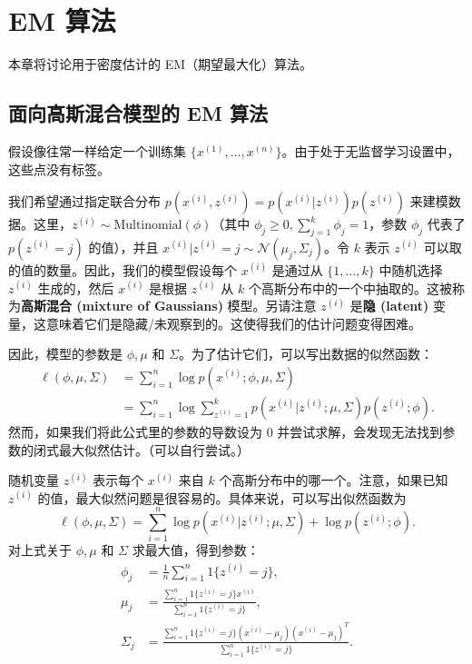\chapter{EM 算法}\label{chapter:11}

本章将讨论用于密度估计的 EM（期望最大化）算法。

\section{面向高斯混合模型的 EM 算法}

假设像往常一样给定一个训练集 $\{x^{(1)}, \dots, x^{(n)}\}$。由于处于无监督学习设置中，这些点没有标签。

我们希望通过指定联合分布 $p(x^{(i)}, z^{(i)}) = p(x^{(i)}|z^{(i)})p(z^{(i)})$ 来建模数据。这里，$z^{(i)} \sim \text{Multinomial}(\phi)$（其中 $\phi_j \geq 0, \sum_{j=1}^k \phi_j = 1$，参数 $\phi_j$ 代表了 $p(z^{(i)} = j)$ 的值），并且 $x^{(i)}|z^{(i)} = j \sim \mathcal{N}(\mu_j, \Sigma_j)$。令 $k$ 表示 $z^{(i)}$ 可以取的值的数量。因此，我们的模型假设每个 $x^{(i)}$ 是通过从 $\{1, \dots, k\}$ 中随机选择 $z^{(i)}$ 生成的，然后 $x^{(i)}$ 是根据 $z^{(i)}$ 从 $k$ 个高斯分布中的一个中抽取的。这被称为\textbf{高斯混合 (mixture of Gaussians)} 模型。另请注意 $z^{(i)}$ 是\textbf{隐 (latent)} 变量，这意味着它们是隐藏/未观察到的。这使得我们的估计问题变得困难。

因此，模型的参数是 $\phi, \mu$ 和 $\Sigma$。为了估计它们，可以写出数据的似然函数：
\begin{align*}
    \ell(\phi, \mu, \Sigma) &= \sum_{i=1}^n \log p(x^{(i)}; \phi, \mu, \Sigma) \\
    &= \sum_{i=1}^n \log \sum_{z^{(i)}=1}^k p(x^{(i)}|z^{(i)}; \mu, \Sigma)p(z^{(i)}; \phi).
\end{align*}
然而，如果我们将此公式里的参数的导数设为 0 并尝试求解，会发现无法找到参数的闭式最大似然估计。（可以自行尝试。）

随机变量 $z^{(i)}$ 表示每个 $x^{(i)}$ 来自 $k$ 个高斯分布中的哪一个。注意，如果已知 $z^{(i)}$ 的值，最大似然问题是很容易的。具体来说，可以写出似然函数为
\[
    \ell(\phi, \mu, \Sigma) = \sum_{i=1}^n \log p(x^{(i)}|z^{(i)}; \mu, \Sigma) + \log p(z^{(i)}; \phi).
\]
对上式关于 $\phi, \mu$ 和 $\Sigma$ 求最大值，得到参数：
\begin{align*}
    \phi_j &= \frac{1}{n} \sum_{i=1}^n 1\{z^{(i)} = j\},\\
    \mu_j &= \frac{\sum_{i=1}^n 1\{z^{(i)} = j\}x^{(i)}}{\sum_{i=1}^n 1\{z^{(i)} = j\}},\\
    \Sigma_j &= \frac{\sum_{i=1}^n 1\{z^{(i)} = j\}(x^{(i)} - \mu_j)(x^{(i)} - \mu_j)^T}{\sum_{i=1}^n 1\{z^{(i)} = j\}}.
\end{align*}

